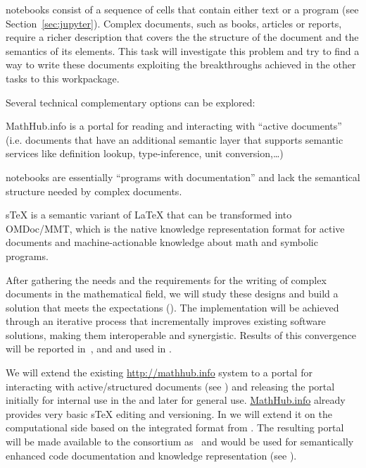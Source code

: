 \begin{workpackage}
\begin{tasklist}
\begin{task}[title=Structured documents,id=structdocs,
  lead=JU,PM=22,partners={SR,USH,LL,FAU},wphases=0-24,issue=74]
  \Jupyter notebooks consist of a sequence of cells that contain
  either text or a program (see Section~\ref{sec:jupyter}). Complex
  documents, such as books, articles or reports, require a richer
  description that covers the the structure of the document and the
  semantics of its elements. This task will investigate this problem
  and try to find a way to write these documents exploiting the
  breakthroughs achieved in the other tasks to this workpackage.

  Several technical complementary options can be explored:
  \begin{compactitem}
  \item MathHub.info is a portal for reading and interacting with
    ``active documents'' (i.e. documents that have an additional
    semantic layer that supports semantic services like definition
    lookup, type-inference, unit conversion,\ldots)
  \item \Jupyter notebooks are essentially ``programs with documentation'' and lack the
    semantical structure needed by complex documents.
  \item sTeX is a semantic variant of LaTeX that can be transformed into OMDoc/MMT, which
    is the native knowledge representation format for active documents and
    machine-actionable knowledge about math and symbolic programs.
  \end{compactitem}

  After gathering the needs and the requirements for the writing of
  complex documents in the mathematical field, we will study these
  designs and build a solution that meets the expectations
  (). The implementation will be achieved
  through an iterative process that incrementally improves existing
  software solutions, making them interoperable and synergistic.
  Results of this convergence will be reported
  in~,  and
   and used in .
\end{task}

\begin{task}[id=mathhub,title=Active Documents Portal,lead=FAU,PM=12,partners={JU},
  wphases=12-36!.5,issue=75]
  We will extend the existing \url{http://mathhub.info} system to a
  portal for interacting with active/structured documents (see
  ) and releasing the portal initially for
  internal use in the \TheProject and later for general
  use. \url{MathHub.info} already provides very basic sTeX editing and
  versioning. In \TheProject we will extend it on the computational
  side based on the integrated format from
  . The resulting portal will be made
  available to the consortium as~ and
  would be used for semantically enhanced code documentation and
  knowledge representation (see ).
\end{task}


\end{tasklist}
\end{workpackage}
